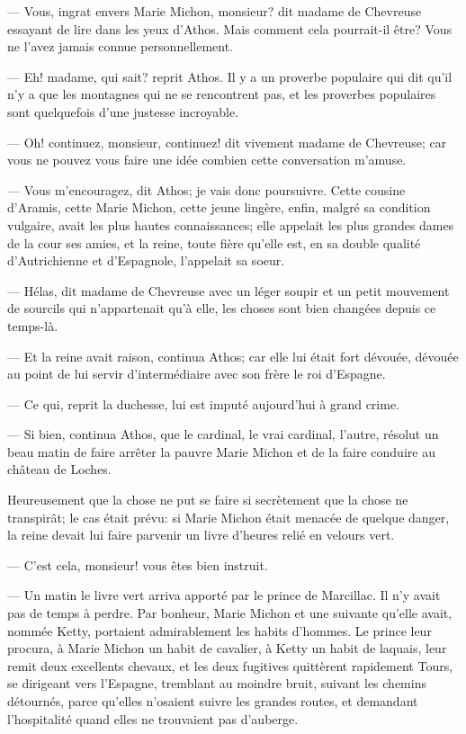 — Vous, ingrat envers Marie Michon, monsieur? dit madame de Chevreuse essayant de lire dans les yeux d'Athos. Mais comment cela pourrait-il être? Vous ne l'avez jamais connue personnellement.

— Eh! madame, qui sait? reprit Athos. Il y a un proverbe populaire qui dit qu'il n'y a que les montagnes qui ne se rencontrent pas, et les proverbes populaires sont quelquefois d'une justesse incroyable.

— Oh! continuez, monsieur, continuez! dit vivement madame de Chevreuse; car vous ne pouvez vous faire une idée combien cette conversation m'amuse.

— Vous m'encouragez, dit Athos; je vais donc poursuivre. Cette cousine d'Aramis, cette Marie Michon, cette jeune lingère, enfin, malgré sa condition vulgaire, avait les plus hautes connaissances; elle appelait les plus grandes dames de la cour ses amies, et la reine, toute fière qu'elle est, en sa double qualité d'Autrichienne et d'Espagnole, l'appelait sa soeur.

— Hélas, dit madame de Chevreuse avec un léger soupir et un petit mouvement de sourcils qui n'appartenait qu'à elle, les choses sont bien changées depuis ce temps-là.

— Et la reine avait raison, continua Athos; car elle lui était fort dévouée, dévouée au point de lui servir d'intermédiaire avec son frère le roi d'Espagne.

— Ce qui, reprit la duchesse, lui est imputé aujourd'hui à grand crime.

— Si bien, continua Athos, que le cardinal, le vrai cardinal, l'autre, résolut un beau matin de faire arrêter la pauvre Marie Michon et de la faire conduire au château de Loches.

Heureusement que la chose ne put se faire si secrètement que la chose ne transpirât; le cas était prévu: si Marie Michon était menacée de quelque danger, la reine devait lui faire parvenir un livre d'heures relié en velours vert.

— C'est cela, monsieur! vous êtes bien instruit.

— Un matin le livre vert arriva apporté par le prince de Marcillac. Il n'y avait pas de temps à perdre. Par bonheur, Marie Michon et une suivante qu'elle avait, nommée Ketty, portaient admirablement les habits d'hommes. Le prince leur procura, à Marie Michon un habit de cavalier, à Ketty un habit de laquais, leur remit deux excellents chevaux, et les deux fugitives quittèrent rapidement Tours, se dirigeant vers l'Espagne, tremblant au moindre bruit, suivant les chemins détournés, parce qu'elles n'osaient suivre les grandes routes, et demandant l'hospitalité quand elles ne trouvaient pas d'auberge.

